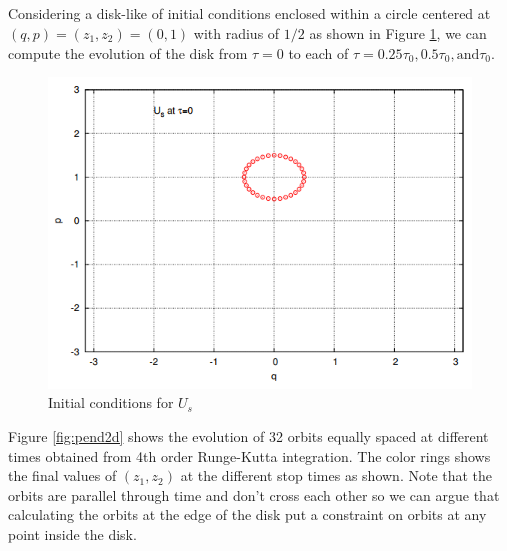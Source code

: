 \subsection{}
Considering a disk-like of initial conditions enclosed within a circle centered at $(q,p)=(z_1,z_2)=(0,1)$ with radius of $1/2$ as shown in Figure \ref{fig:MartinsUs}, we can compute the evolution of the disk from $\tau=0$ to each of $\tau=0.25\tau_0,0.5\tau_0,\mathrm{and}\tau_0$.
\begin{figure}[h]
    \centering
    \includegraphics[width=\columnwidth]{CodeAndFigures/Fig1InitialConditionsUs.png}
    \caption{Initial conditions for $U_s$}
    \label{fig:MartinsUs}
\end{figure}

Figure \ref{fig:pend2d} shows the evolution of 32 orbits equally spaced at different times obtained from 4th order Runge-Kutta integration. The color rings shows the final values of $(z_1,z_2)$ at the different stop times as shown. Note that the orbits are parallel through time and don't cross each other so we can argue that calculating the orbits at the edge of the disk put a constraint on orbits at any point inside the disk. 


